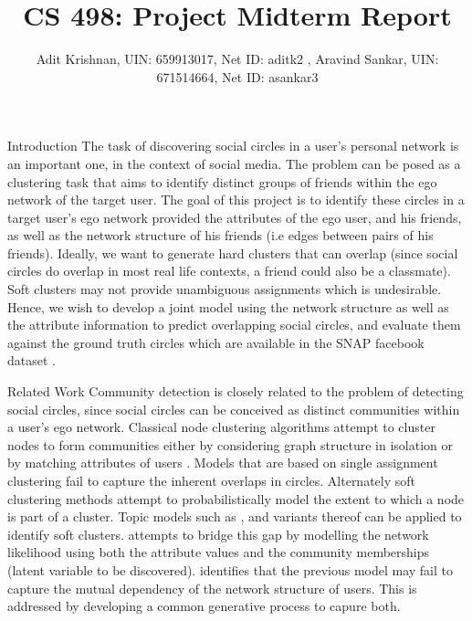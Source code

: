 \documentclass[11pt]{article}
\begin{document}
 
 
 
\title{CS 498: Project Midterm Report}%
\author{Adit Krishnan, UIN: 659913017, Net ID: aditk2 , Aravind Sankar, UIN: 671514664, Net ID: asankar3 \\} %
\maketitle
\begin{section}{Introduction}
The task of discovering social circles in a user's personal network is an important one, in the context of social media. The problem can be posed as a clustering task that aims to identify distinct groups of friends within the ego network of the target user. The goal of this project is to identify these circles in a target user's ego network provided the attributes of the ego user, and his friends, as well as the network structure of his friends (i.e edges between pairs of his friends). Ideally, we want to generate hard clusters that can overlap (since social circles do overlap in most real life contexts, a friend could also be a classmate). Soft clusters may not provide unambiguous assignments which is undesirable. Hence, we wish to develop a joint model using the network structure as well as the attribute information to predict overlapping social circles, and evaluate them against the ground truth circles which are available in the SNAP facebook dataset \cite{facebook dataset}.
\end{section}
\begin{section}{Related Work}
Community detection is closely related to the problem of detecting social circles, since social circles can be conceived as distinct communities within a user's ego network. Classical node clustering algorithms attempt to cluster nodes to form communities either by considering graph structure in isolation or by matching attributes of users \cite{johnson}. Models that are based on single assignment clustering \cite{l1,l2} fail to capture the inherent overlaps in circles. Alternately soft clustering methods attempt to probabilistically model the extent to which a node is part of a cluster. Topic models such as \cite{plsa}, \cite{lda} and variants thereof can be applied to identify soft clusters. \cite{facebook dataset} attempts to bridge this gap by modelling the network likelihood using both the attribute values and the community memberships (latent variable to be discovered).\cite{cesna} identifies that the previous model may fail to capture the mutual dependency of the network structure of users. This is addressed by developing a common generative process to capure both. 
\end{section}
\end{document}
